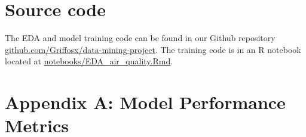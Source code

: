 \documentclass[twoside,11pt]{article}
\begin{document}
\section{Source code}

The EDA and model training code can be found in our Github repository \href{https://github.com/Griffosx/data-mining-project}{github.com/Griffosx/data-mining-project}. 
The training code is in an R notebook located at \href{https://github.com/Griffosx/data-mining-project/blob/main/notebooks/EDA_air_quality.Rmd}{notebooks/EDA\_air\_quality.Rmd}.

\newpage

\section*{Appendix A: Model Performance Metrics}
\end{document}
